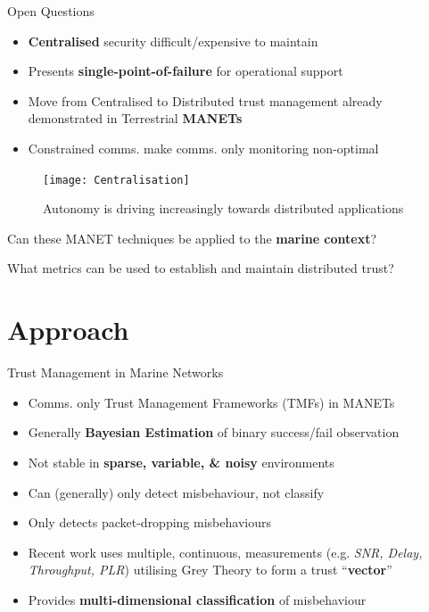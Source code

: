 \documentclass{beamer}
\begin{document}
\begin{frame}{Open Questions}
		\begin{itemize}
			\item \textbf{Centralised} security difficult/expensive to maintain
			\item Presents \textbf{single-point-of-failure} for operational support
			\item Move from Centralised to Distributed trust management already demonstrated in Terrestrial \textbf{MANETs}
			\item Constrained comms. make comms. only monitoring non-optimal
		\end{itemize}

		\begin{figure}[h]
			\centering
			\texttt{[image: Centralisation]}
			\caption{Autonomy is driving increasingly towards distributed applications}
		\end{figure}
	
	\centering
	Can these MANET techniques be applied to the \textbf{marine context}?
	
	\centering
	What metrics can be used to establish and maintain distributed trust?

\end{frame}

\section{Approach}

\begin{frame}{Trust Management in Marine Networks}
	\begin{itemize}
		\item Comms. only Trust Management Frameworks (TMFs) in MANETs
		\item Generally \textbf{Bayesian Estimation} of binary success/fail observation
		\item Not stable in \textbf{sparse, variable, \& noisy} environments
		\item Can (generally) only detect misbehaviour, not classify
		\item Only detects packet-dropping misbehaviours
		\item Recent work uses multiple, continuous, measurements (e.g. \textit{SNR, Delay, Throughput, PLR}) utilising Grey Theory\cite{Guo11} to form a trust ``\textbf{vector}''
		\item Provides \textbf{multi-dimensional classification} of misbehaviour
	\end{itemize}
\end{frame}
\end{document}
